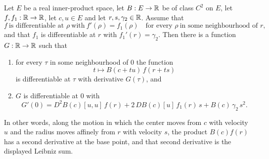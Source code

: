 \begin{lemma}
Let $E$ be a real inner-product space, let $B:E\to\mathbb{R}$ be of class $C^2$ on $E$,
let $f,f_1:\mathbb{R}\to\mathbb{R}$, let $c,u\in E$ and let $r,s,\gamma_2\in\mathbb{R}$. Assume that
\[
  f\ \text{is differentiable at }\rho\ \text{with}\ f'(\rho)=f_1(\rho)
  \quad\text{for every }\rho\ \text{in some neighbourhood of }r,
\]
and that $f_1$ is differentiable at $r$ with $f_1'(r)=\gamma_2$. Then there is a
function $G:\mathbb{R}\to\mathbb{R}$ such that
\begin{enumerate}
\item for every $\tau$ in some neighbourhood of $0$ the function
  \[
    t\longmapsto B(c+tu)\,f(r+ts)
  \]
  is differentiable at $\tau$ with derivative $G(\tau)$, and
\item $G$ is differentiable at $0$ with
  \[
    G'(0)=D^2B(c)[u,u]\,f(r)+2\,DB(c)[u]\,f_1(r)\,s+B(c)\,\gamma_2\,s^2 .
  \]
\end{enumerate}
In other words, along the motion in which the center moves from $c$ with
velocity $u$ and the radius moves affinely from $r$ with velocity $s$, the
product $B(c)f(r)$ has a second derivative at the base point, and that second
derivative is the displayed Leibniz sum.
\end{lemma}
